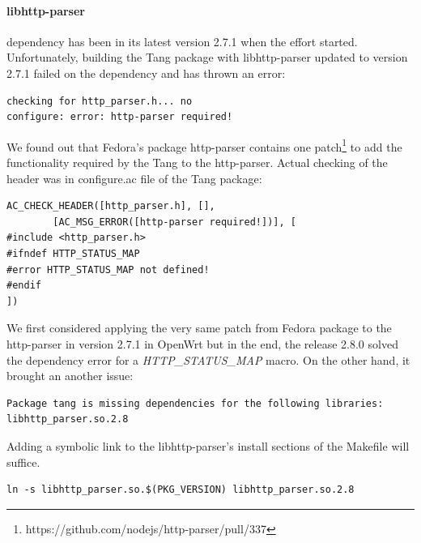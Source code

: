 \paragraph{libhttp-parser} dependency has been in its latest version 2.7.1 when the effort started.
Unfortunately, building the Tang package with libhttp-parser updated to version 2.7.1 failed on the dependency and has thrown an error:
\begin{lstlisting}[columns=fixed,basicstyle=\ttfamily\footnotesize,tabsize=4,backgroundcolor=\color{yellow!10}]
checking for http_parser.h... no
configure: error: http-parser required!
\end{lstlisting}
We found out that Fedora's package http-parser contains one patch\footnote{https://github.com/nodejs/http-parser/pull/337} to add the functionality required by the Tang to the http-parser.
Actual checking of the header was in configure.ac file of the Tang package:
\begin{lstlisting}[columns=fixed,basicstyle=\ttfamily\footnotesize,tabsize=4,backgroundcolor=\color{yellow!10}]
AC_CHECK_HEADER([http_parser.h], [],
		[AC_MSG_ERROR([http-parser required!])], [
#include <http_parser.h>
#ifndef HTTP_STATUS_MAP
#error HTTP_STATUS_MAP not defined!
#endif
])
\end{lstlisting}
We first considered applying the very same patch from Fedora package to the http-parser in version 2.7.1 in OpenWrt but in the end, the release 2.8.0 solved the dependency error for a {\it HTTP\_STATUS\_MAP} macro.
On the other hand, it brought an another issue:
\begin{lstlisting}[columns=fixed,basicstyle=\ttfamily\footnotesize,tabsize=4,backgroundcolor=\color{yellow!10}]
Package tang is missing dependencies for the following libraries:
libhttp_parser.so.2.8
\end{lstlisting}
Adding a symbolic link to the libhttp-parser's install sections of the Makefile will suffice.
\begin{lstlisting}[columns=fixed,basicstyle=\ttfamily\footnotesize,tabsize=4,backgroundcolor=\color{yellow!10}]
ln -s libhttp_parser.so.$(PKG_VERSION) libhttp_parser.so.2.8
\end{lstlisting}
